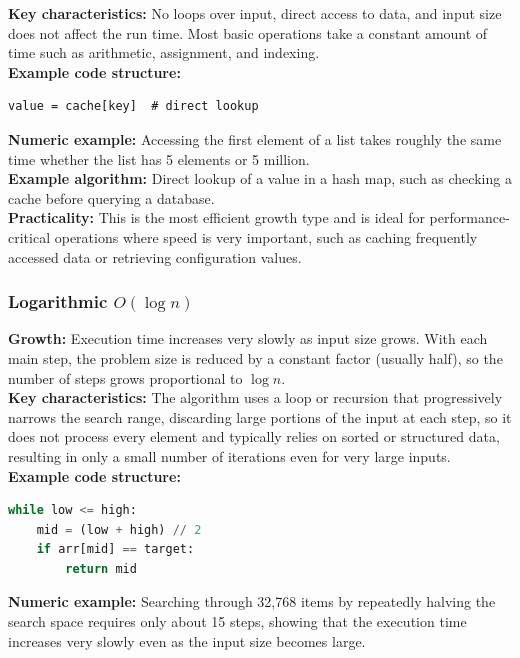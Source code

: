 \documentclass[12pt]{article}
\begin{document}
\noindent\textbf{Key characteristics:}
No loops over input, direct access to data, and input size does not affect the run time. Most basic operations take a constant amount of time such as arithmetic, assignment, and indexing.\\

\noindent\textbf{Example code structure:}
\begin{lstlisting}
value = cache[key]  # direct lookup
\end{lstlisting}

\noindent\textbf{Numeric example:}
Accessing the first element of a list takes roughly the same time whether the list has 5 elements or 5 million.\\

\noindent\textbf{Example algorithm:}
Direct lookup of a value in a hash map, such as checking a cache before querying a database.\\

\noindent\textbf{Practicality:}
This is the most efficient growth type and is ideal for performance-critical operations where speed is very important, such as caching frequently accessed data or retrieving configuration values.

\subsubsection{Logarithmic $O(\log n)$}

\noindent\textbf{Growth:}
Execution time increases very slowly as input size grows. With each main step, the problem size is reduced by a constant factor (usually half), so the number of steps grows proportional to $\log n$.\\

\noindent\textbf{Key characteristics:}
The algorithm uses a loop or recursion that progressively narrows the search range, discarding large portions of the input at each step, so it does not process every element and typically relies on sorted or structured data, resulting in only a small number of iterations even for very large inputs.\\

\noindent\textbf{Example code structure:}
\begin{lstlisting}[language=Python]
while low <= high:
    mid = (low + high) // 2
    if arr[mid] == target:
        return mid
\end{lstlisting}

\noindent\textbf{Numeric example:}
Searching through 32,768 items by repeatedly halving the search space requires only about 15 steps, showing that the execution time increases very slowly even as the input size becomes large.\\
\end{document}
